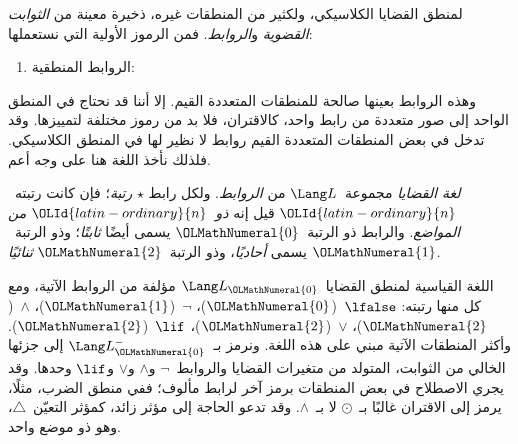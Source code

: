 \documentclass[../../../include/open-logic-section]{subfiles}
\begin{document}


لمنطق القضايا الكلاسيكي، ولكثير من المنطقات غيره، ذخيرة معينة من
\emph{الثوابت القضوية} و\emph{الروابط}. فمن الرموز الأولية التي
نستعملها:
\begin{enumerate}
\item الروابط المنطقية:
  \startycommalist
\end{enumerate}

وهذه الروابط بعينها صالحة للمنطقات المتعددة القيم. إلا أننا قد نحتاج
في المنطق الواحد إلى صور متعددة من رابط واحد، كالاقتران، فلا بد من
رموز مختلفة لتمييزها. وقد تدخل في بعض المنطقات المتعددة القيم روابط
لا نظير لها في المنطق الكلاسيكي. فلذلك نأخذ اللغة هنا على وجه أعم.

\begin{defn}
  \emph{لغة القضايا} مجموعة~$\Lang L$ من \emph{الروابط}. ولكل رابط
  $\star$ \emph{رتبة}؛ فإن كانت رتبته~$\OLId{latin-ordinary}{n}$ قيل إنه \emph{ذو~$\OLId{latin-ordinary}{n}$ من
  المواضع}. والرابط ذو الرتبة~$\OLMathNumeral{0}$ يسمى أيضًا \emph{ثابتًا}؛ وذو
  الرتبة~$\OLMathNumeral{1}$ يسمى \emph{أحاديًا}، وذو الرتبة~$\OLMathNumeral{2}$ \emph{ثنائيًا}.
\end{defn}

\begin{ex}
  اللغة القياسية لمنطق القضايا~$\Lang L_\OLMathNumeral{0}$ مؤلفة من الروابط الآتية،
  ومع كل منها رتبته:
  $\lfalse$~($\OLMathNumeral{0}$)،
  $\lnot$~($\OLMathNumeral{1}$)،
  $\land$~($\OLMathNumeral{2}$)،
  $\lor$~($\OLMathNumeral{2}$)،
  $\lif$~($\OLMathNumeral{2}$). وأكثر المنطقات الآتية مبني على هذه اللغة.
  ونرمز بـ~$\Lang L_\OLMathNumeral{0}^{-}$ إلى جزئها الخالي من الثوابت، المتولد من
  متغيرات القضايا والروابط~$\lnot$ و$\land$ و$\lor$ و$\lif$ وحدها.
  وقد يجري الاصطلاح في بعض المنطقات برمز آخر لرابط مألوف؛ ففي منطق
  الضرب، مثلًا، يرمز إلى الاقتران غالبًا بـ~$\odot$ لا بـ~$\land$.
  وقد تدعو الحاجة إلى مؤثر زائد، كمؤثر التعيّن~$\triangle$، وهو ذو
  موضع واحد.
\end{ex}
\end{document}
